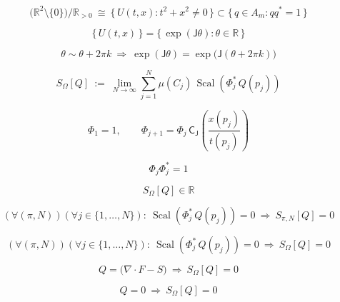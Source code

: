 \documentclass[12pt]{article}
\begin{document}
\begin{equation}
\bigl(\mathbb{R}^2\setminus\{0\}\bigr)\big/\mathbb{R}_{>0}\ \cong\ \bigl\{\,U(t,x):t^2+x^2\ne 0\,\bigr\}\subset \bigl\{\,q\in A_m:qq^{*}=1\,\bigr\}
\end{equation}

\begin{equation}
\bigl\{\,U(t,x)\,\bigr\}=\bigl\{\,\exp(\mathsf{J}\theta):\theta\in\mathbb{R}\,\bigr\}
\end{equation}

\begin{equation}
\theta\sim\theta+2\pi k\ \Longrightarrow\ \exp(\mathsf{J}\theta)=\exp\!\big(\mathsf{J}(\theta+2\pi k)\big)
\end{equation}

\begin{equation}
S_\Omega[Q]\ :=\ \lim_{N\to\infty}\sum_{j=1}^N \mu(C_j)\,\operatorname{Scal}\!\left(\Phi_j^{*}\,Q(p_j)\right)
\end{equation}

\begin{equation}
\Phi_1=1,\qquad \Phi_{j+1}=\Phi_j\,\mathsf{C}_{\mathsf{J}}\!\left(\frac{x(p_j)}{t(p_j)}\right)
\end{equation}

\begin{equation}
\Phi_j\Phi_j^{*}=1
\end{equation}

\begin{equation}
S_\Omega[Q]\in\mathbb{R}
\end{equation}

\begin{equation}
\left(\forall(\pi,N)\right)\left(\forall j\in\{1,\dots,N\}\right):\ 
\operatorname{Scal}\!\left(\Phi_j^{*}\,Q(p_j)\right)=0
\ \Longrightarrow\ 
S_{\pi,N}[Q]=0
\end{equation}

\begin{equation}
\left(\forall(\pi,N)\right)\left(\forall j\in\{1,\dots,N\}\right):\ 
\operatorname{Scal}\!\left(\Phi_j^{*}\,Q(p_j)\right)=0
\ \Longrightarrow\ 
S_{\Omega}[Q]=0
\end{equation}

\begin{equation}
Q=\big(\nabla\cdot F-S\big)\ \Longrightarrow\ S_\Omega[Q]=0
\end{equation}

\begin{equation}
Q=0\ \Longrightarrow\ S_\Omega[Q]=0
\end{equation}
\end{document}
